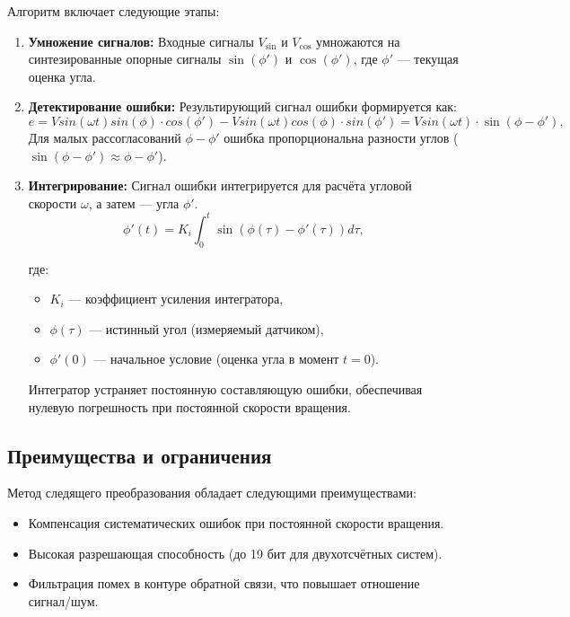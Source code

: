 Алгоритм включает следующие этапы:
\begin{enumerate}
    \item \textbf{Умножение сигналов:} Входные сигналы \( V_{\text{sin}} \) и \( V_{\text{cos}} \) умножаются на синтезированные опорные сигналы \( \sin(\phi') \) и \( \cos(\phi') \), где \( \phi' \) — текущая оценка угла. 
    \item \textbf{Детектирование ошибки:} Результирующий сигнал ошибки формируется как: 
    \begin{equation}
      e = V sin(\omega t) sin(\phi) \cdot cos(\phi') - V sin(\omega t) cos(\phi) \cdot sin(\phi') = V sin(\omega t) \cdot \sin(\phi - \phi'),
      \label{eq:error}
    \end{equation}
    Для малых рассогласований \( \phi - \phi' \) ошибка пропорциональна разности углов ($\sin(\phi - \phi') \approx \phi - \phi'$).
    \item \textbf{Интегрирование:} Сигнал ошибки интегрируется для расчёта угловой скорости \( \omega \), а затем — угла \( \phi' \). 
    \begin{equation}
      \phi'(t) = K_i \int_0^t \sin\left(\phi(\tau) - \phi'(\tau)\right) d\tau,
      \label{eq:phi_prime}
    \end{equation}
      
      где:
    \begin{itemize}
        \item \(K_i\) — коэффициент усиления интегратора,
        \item \(\phi(\tau)\) — истинный угол (измеряемый датчиком),
        \item \(\phi'(0)\) — начальное условие (оценка угла в момент \(t=0\)).
    \end{itemize}


    Интегратор устраняет постоянную составляющую ошибки, обеспечивая нулевую погрешность при постоянной скорости вращения.
\end{enumerate}

\subsection{Преимущества и ограничения}
Метод следящего преобразования обладает следующими преимуществами:
\begin{itemize}
    \item Компенсация систематических ошибок при постоянной скорости вращения.
    \item Высокая разрешающая способность (до 19 бит для двухотсчётных систем).
    \item Фильтрация помех в контуре обратной связи, что повышает отношение сигнал/шум.
\end{itemize}

